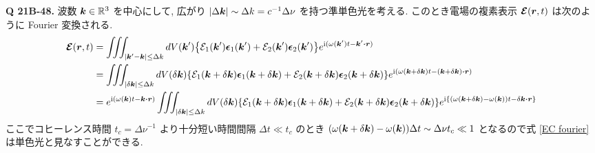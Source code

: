 \documentclass[a4paper,dvipdfmx]{jsarticle}
\theoremstyle{definition}
\begin{document}
\textbf{Q 21B-48.}
波数 $\vb*{k}\in\mathbb{R}^3$ を中心にして, 広がり $|\Delta\vb*{k}|\sim\Delta k = c^{-1}\Delta\nu$ を持つ準単色光を考える. このとき電場の複素表示 $\vb*{\mathcal{E}}(\vb*{r}, t)$ は次のように Fourier 変換される.
\begin{align}
  \EC(\rr, t)
   & = \iiint_{|\kk' - \kk|\leq\Delta k}dV(\kk')\qty{\Ec_1(\kk')\ee_1(\kk') + \Ec_2(\kk')\ee_2(\kk')}e^{\ii(\omega(\kk')t - \kk'\vdot\rr)}                                                                                                                                           \\
   & = \iiint_{|\delta\kk|\leq\Delta k}dV(\delta\kk)\qty{\Ec_1(\kk + \delta\kk)\ee_1(\kk + \delta\kk) + \Ec_2(\kk + \delta\kk)\ee_2(\kk + \delta\kk)}e^{\ii(\omega(\kk + \delta\kk)t - (\kk + \delta\kk)\vdot\rr)}                                                                   \\
   & = e^{\ii(\omega(\kk)t - \kk\vdot\rr)}\iiint_{|\delta\kk|\leq\Delta k}dV(\delta\kk)\qty{\Ec_1(\kk + \delta\kk)\ee_1(\kk + \delta\kk) + \Ec_2(\kk + \delta\kk)\ee_2(\kk + \delta\kk)}e^{\ii\qty{(\omega(\kk + \delta\kk) - \omega(\kk))t - \delta\kk\vdot\rr}} \label{EC fourier} \\
\end{align}
ここでコヒーレンス時間 $t_c = \Delta\nu^{-1}$ より十分短い時間間隔 $\Delta t \ll t_c$ のとき $(\omega(\vb*{k} + \delta\vb*{k}) - \omega(\vb*{k}))\Delta t \sim \Delta\nu t_c \ll 1$ となるので式 \eqref{EC fourier} は単色光と見なすことができる. \\
\end{document}
